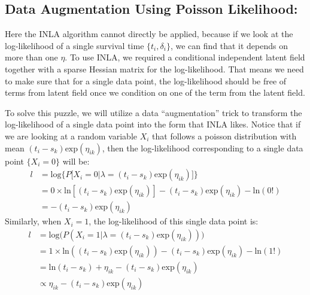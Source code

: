 \documentclass[]{article}
\begin{document}
\hypertarget{data-augmentation-using-poisson-likelihood}{%
\subsection{Data Augmentation Using Poisson
Likelihood:}\label{data-augmentation-using-poisson-likelihood}}

Here the INLA algorithm cannot directly be applied, because if we look
at the log-likelihood of a single survival time \(\{t_i,\delta_i\}\), we
can find that it depends on more than one \(\eta\). To use INLA, we
required a conditional independent latent field together with a sparse
Hessian matrix for the log-likelihood. That means we need to make sure
that for a single data point, the log-likelihood should be free of terms
from latent field once we condition on one of the term from the latent
field.

To solve this puzzle, we will utilize a data ``augmentation'' trick to
transform the log-likelihood of a single data point into the form that
INLA likes. Notice that if we are looking at a random variable \(X_i\)
that follows a poisson distribution with mean
\((t_i-s_k)\text{exp}(\eta_{ik})\), then the log-likelihood
corresponding to a single data point \(\{X_i = 0 \}\) will be:
\begin{equation}\begin{aligned}\label{eqn:loglike1}
l &= \text{log}\bigg \{P\big [X_i =0|\lambda = (t_i-s_k)\text{exp}(\eta_{ik}) \big]\bigg \}\\
  &= 0\times \text{ln}[(t_i-s_k)\text{exp}(\eta_{ik})] - (t_i-s_k)\text{exp}(\eta_{ik}) - \text{ln}(0!)\\
  &= - (t_i-s_k)\text{exp}(\eta_{ik})
\end{aligned}\end{equation} Similarly, when \(X_i = 1\), the
log-likelihood of this single data point is:
\begin{equation}\begin{aligned}\label{eqn:loglike2}
l &= \text{log}\bigg(P(X_i =1|\lambda = (t_i-s_k)\text{exp}(\eta_{ik}))\bigg)\\
  &= 1\times \text{ln}((t_i-s_k)\text{exp}(\eta_{ik})) - (t_i-s_k)\text{exp}(\eta_{ik}) - \text{ln}(1!)\\
  &= \text{ln}(t_i-s_k)+\eta_{ik}-(t_i-s_k)\text{exp}(\eta_{ik})\\
  &\propto \eta_{ik}-(t_i-s_k)\text{exp}(\eta_{ik})
\end{aligned}\end{equation}
\end{document}
